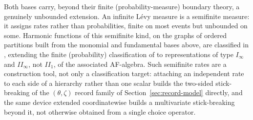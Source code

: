 \documentclass[11pt]{article}
\theoremstyle{plain}
\theoremstyle{definition}
\begin{document}
Both bases carry, beyond their finite (probability-measure) boundary theory, a genuinely unbounded extension. An infinite Lévy measure is a semifinite measure: it assigns rates rather than probabilities, finite on most events but unbounded on some. Harmonic functions of this semifinite kind, on the graphs of ordered partitions built from the monomial and fundamental bases above, are classified in \cite{Safonkin2021GK,Safonkin2021Zigzag}, extending the finite (probability) classification of \cite{GnedinRepresentationofCompositionStructures,gnedin2006coherent} to representations of type \(I_\infty\) and \(II_\infty\), not \(II_1\), of the associated AF-algebra. Such semifinite rates are a construction tool, not only a classification target: attaching an independent rate to each side of a hierarchy rather than one scalar builds the two-sided stick-breaking of the \((\theta,\zeta)\) record family of Section~\ref{sec:record-model} directly, and the same device extended coordinatewise builds a multivariate stick-breaking beyond it, not otherwise obtained from a single choice operator.
\end{document}
